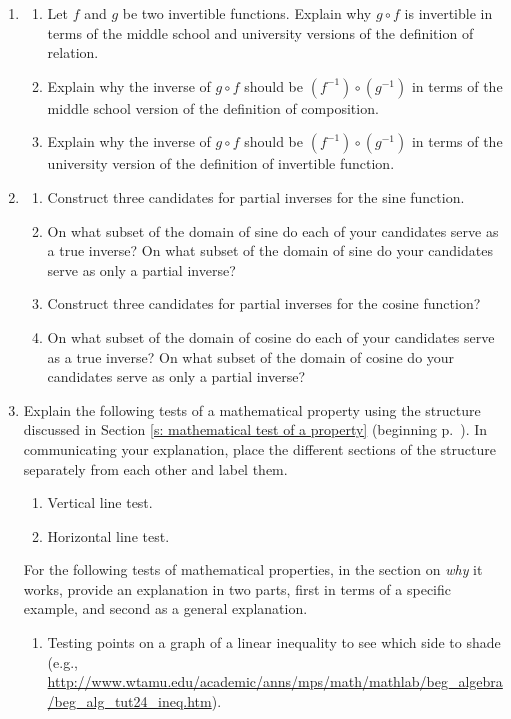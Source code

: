 \documentclass[11pt]{article}
\theoremstyle{definition}
\begin{document}
\begin{enumerate}[resume]
\item %
	\begin{enumerate}
	\item Let $f$ and $g$ be two invertible functions.
	Explain why $g\circ f$ is invertible in terms of the middle school and university versions of the definition of relation.
	\item Explain why the inverse of $g\circ f$ should be $(f^{-1})\circ (g^{-1})$ in terms of the middle school version of the definition of composition.
	\item Explain why the inverse of $g\circ f$ should be $(f^{-1})\circ (g^{-1})$ in terms of the university version of the definition of invertible function.
	\end{enumerate}
	
\item %
	\begin{enumerate}
	\item Construct three candidates for partial inverses for the sine function.
	\item On what subset of the domain of sine do each of your candidates serve as a true inverse? On what subset of the domain of sine do your candidates serve as only a partial inverse?
	\item Construct three candidates for partial inverses for the cosine function?
	\item On what subset of the domain of cosine do each of your candidates serve as a true inverse? On what subset of the domain of cosine do your candidates serve as only a partial inverse?
	\end{enumerate}
	
\item  Explain the following tests of a mathematical property using the structure 
discussed in Section \ref{s: mathematical test of a property} (beginning p.~\pageref{s: mathematical test of a property}). In communicating your explanation, place the different sections of the structure separately from each other and label them.
	\begin{enumerate}
	\item Vertical line test.
	\item Horizontal line test.
	\end{enumerate}
	For the following tests of mathematical properties, in the section on {\it why} it works, provide an explanation in two parts, first in terms of a specific example, and second as a general explanation.
	\begin{enumerate}[resume]
	\item Testing points on a graph of a linear inequality to see which side to shade (e.g., \url{http://www.wtamu.edu/academic/anns/mps/math/mathlab/beg_algebra/beg_alg_tut24_ineq.htm}).
	

\end{enumerate}
\end{enumerate}
\end{document}
